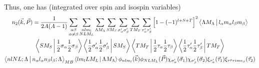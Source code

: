 \documentclass[12pt]{article}
\begin{document}
Thus, one has (integrated over spin and isospin variables)
\begin{multline}
n_2(\vec{k},\vec{P}) =  \frac{1}{2A(A-1)}\sum_{\substack{\alpha \beta \\ \alpha  \neq \beta}} \sum_{\substack{nlm_l \\ NLM_L}}\sum_{\Lambda M_\Lambda} \sum_{S M_S} \sum_{\sigma^{\prime}_\alpha  \sigma^{\prime}_\beta }  \sum_{T M_T} \sum_{\tau^{\prime}_\alpha  \tau^{\prime}_\beta } \left[ 1-(-1)^{l+S+T} \right]^2 \Braket{\Lambda M_\Lambda | l_\alpha m_\alpha l_\beta m_\beta}\\ \Braket{S M_S | \frac{1}{2}  \sigma_\alpha  \frac{1}{2} \sigma_\beta} \Braket{   \frac{1}{2}  \sigma^{\prime}_\alpha  \frac{1}{2} \sigma^{\prime}_\beta | S M_S }  \Braket{T M_T | \frac{1}{2}  \tau_\alpha  \frac{1}{2} \tau_\beta}  \Braket{   \frac{1}{2}  \tau^{\prime}_\alpha  \frac{1}{2} \tau^{\prime}_\beta | T M_T } \\ \Braket{nlNL;\Lambda |  n_\alpha l_\alpha n_\beta l_\beta;\Lambda}_{MB}  \Braket{lm_l L M_L|\Lambda M_\Lambda}  \phi_{nlm_l}(\vec{k}) \phi_{NLM_L}(\vec{P}) \chi_{\sigma^{\prime}_\alpha}(\vec{\sigma}_1) \chi_{\sigma^{\prime}_\beta}(\vec{\sigma}_2) \xi_{\tau^\prime_\alpha}(\vec{\tau}_1) \xi_{\tau^prime_\beta}(\vec{\tau}_2)
\end{multline}
\end{document}

